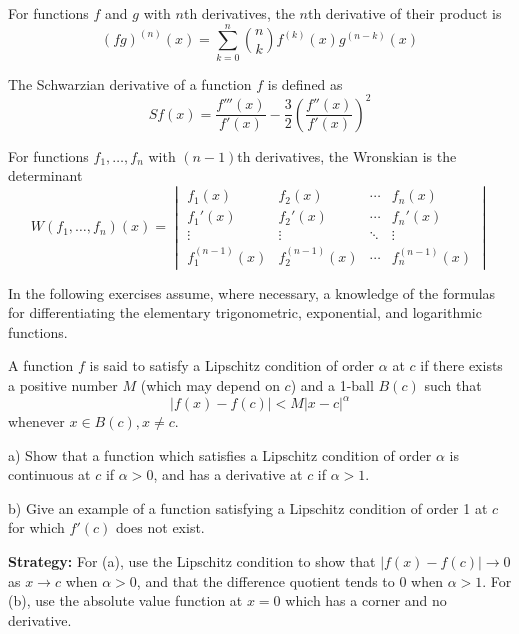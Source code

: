 \begin{theorem}
For functions $f$ and $g$ with $n$th derivatives, the $n$th derivative of their product is
\[ (fg)^{(n)}(x) = \sum_{k=0}^{n} \binom{n}{k} f^{(k)}(x)g^{(n-k)}(x) \]
\end{theorem}

\begin{theorem}
The Schwarzian derivative of a function $f$ is defined as
\[ Sf(x) = \frac{f'''(x)}{f'(x)} - \frac{3}{2}\left(\frac{f''(x)}{f'(x)}\right)^2 \]
\end{theorem}

\begin{theorem}[Wronskian]
For functions $f_1, \ldots, f_n$ with $(n-1)$th derivatives, the Wronskian is the determinant
\[ W(f_1, \ldots, f_n)(x) = \begin{vmatrix}
f_1(x) & f_2(x) & \cdots & f_n(x) \\
f_1'(x) & f_2'(x) & \cdots & f_n'(x) \\
\vdots & \vdots & \ddots & \vdots \\
f_1^{(n-1)}(x) & f_2^{(n-1)}(x) & \cdots & f_n^{(n-1)}(x)
\end{vmatrix} \]
\end{theorem}

In the following exercises assume, where necessary, a knowledge of the formulas for differentiating the elementary trigonometric, exponential, and logarithmic functions.

\begin{problembox}
\begin{problemstatement}
A function \( f \) is said to satisfy a Lipschitz condition of order \( \alpha \) at \( c \) if there exists a positive number \( M \) (which may depend on \( c \)) and a 1-ball \( B(c) \) such that 
\[ |f(x) - f(c)| < M|x - c|^\alpha \]
whenever \( x \in B(c), x \neq c \).

a) Show that a function which satisfies a Lipschitz condition of order \( \alpha \) is continuous at \( c \) if \( \alpha > 0 \), and has a derivative at \( c \) if \( \alpha > 1 \).

b) Give an example of a function satisfying a Lipschitz condition of order 1 at \( c \) for which \( f'(c) \) does not exist.
\end{problemstatement}
\end{problembox}

\noindent\textbf{Strategy:} For (a), use the Lipschitz condition to show that $|f(x) - f(c)| \to 0$ as $x \to c$ when $\alpha > 0$, and that the difference quotient tends to 0 when $\alpha > 1$. For (b), use the absolute value function at $x = 0$ which has a corner and no derivative.

